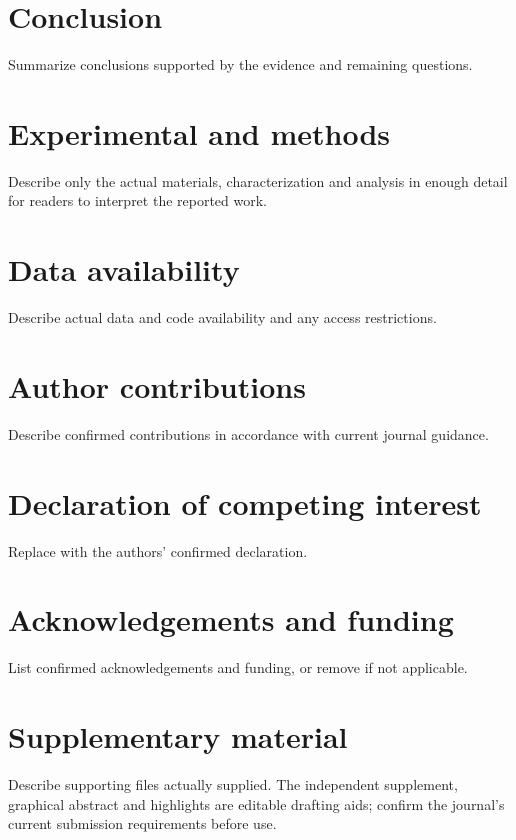 \documentclass[a4paper,preprint,12pt]{elsarticle}
\begin{document}
\section{Conclusion}\label{sec:conclusion}
Summarize conclusions supported by the evidence and remaining questions.
\section{Experimental and methods}\label{sec:methods}
Describe only the actual materials, characterization and analysis in enough
detail for readers to interpret the reported work.

\section*{Data availability}
Describe actual data and code availability and any access restrictions.
\section*{Author contributions}
Describe confirmed contributions in accordance with current journal guidance.
\section*{Declaration of competing interest}
Replace with the authors' confirmed declaration.
\section*{Acknowledgements and funding}
List confirmed acknowledgements and funding, or remove if not applicable.
\section*{Supplementary material}
Describe supporting files actually supplied. The independent supplement,
graphical abstract and highlights are editable drafting aids; confirm the
journal's current submission requirements before use.


\end{document}
